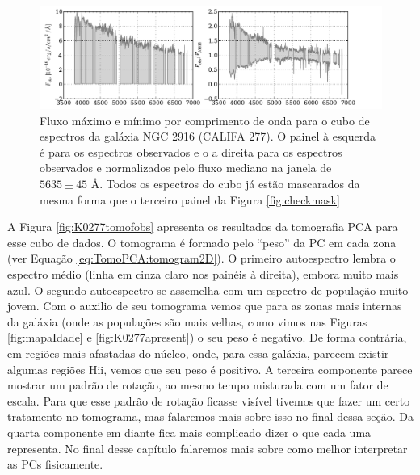 \begin{figure}
	\includegraphics[width=1.\textwidth]{figuras/K0277-exampleSpectraFill.pdf}
    \caption[Máximo e mínimo de fluxo dos espectros da gal\'axia NGC 2916 (CALIFA 277).] 
    {Fluxo máximo e mínimo por comprimento de onda para o cubo de espectros da galáxia NGC 2916 (CALIFA 277). O painel à
    esquerda é para os espectros observados e o a direita para os espectros observados e normalizados pelo fluxo mediano
    na janela de $5635 \pm 45$ \AA. Todos os espectros do cubo já estão mascarados da mesma forma que o terceiro painel
    da Figura \ref{fig:checkmask}}
    \label{fig:K0277ExampleSpectraFill}
\end{figure}

A Figura \ref{fig:K0277tomofobs} apresenta os resultados da tomografia PCA para esse cubo de dados. O tomograma é
formado pelo ``peso'' da PC em cada zona (ver Equação \ref{eq:TomoPCA:tomogram2D}). O primeiro autoespectro lembra o
espectro médio (linha em cinza claro nos painéis à direita), embora muito mais azul. O segundo autoespectro se assemelha
com um espectro de população muito jovem. Com o auxilio de seu tomograma vemos que para as zonas mais internas da
galáxia (onde as populações são mais velhas, como vimos nas Figuras \ref{fig:mapaIdade} e \ref{fig:K0277apresent}) o seu
peso é negativo. De forma contrária, em regiões mais afastadas do núcleo, onde, para essa galáxia, parecem existir
algumas regiões H{\sc ii}, vemos que seu peso é positivo. A terceira componente parece mostrar um padrão de rotação, ao
mesmo tempo misturada com um fator de escala. Para que esse padrão de rotação ficasse visível tivemos que fazer um certo
tratamento no tomograma, mas falaremos mais sobre isso no final dessa seção. Da quarta componente em diante fica mais
complicado dizer o que cada uma representa. No final desse capítulo falaremos mais sobre como melhor interpretar as PCs
fisicamente.

